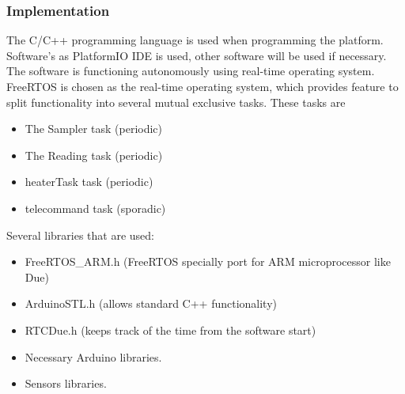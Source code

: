 \documentclass[a4paper,12pt,twoside]{article}
\begin{document}
\subsubsection{Implementation}\label{sec:4.8.3}
The C/C++ programming language is used when programming the platform. Software's as PlatformIO IDE is used, other software will be used if necessary. The software is functioning autonomously using real-time operating system. FreeRTOS is chosen as the real-time operating system, which provides feature to split functionality into several mutual exclusive tasks. These tasks are \begin{itemize}
    \item The Sampler task (periodic)
    \item The Reading task (periodic)
    \item heaterTask task (periodic)
    \item telecommand task (sporadic)
\end{itemize} 
Several libraries that are used:
\begin{itemize}
    \item FreeRTOS\_ARM.h (FreeRTOS specially port for ARM microprocessor like Due)
    \item ArduinoSTL.h (allows standard C++ functionality)
    \item RTCDue.h (keeps track of the time from the software start)
    \item Necessary Arduino libraries.
    \item Sensors libraries.
\end{itemize}


\raggedbottom
\pagebreak
\end{document}
